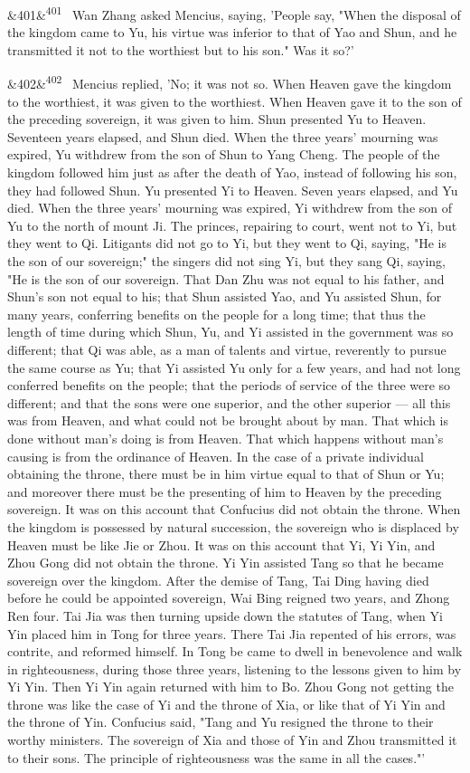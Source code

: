 \documentclass[12pt]{article}
\newcommand{\para}[1][]{\par\noindent\ifx&#1&\else\textsuperscript{\footnotesize #1}~\fi}
\begin{document}
\para[401] Wan Zhang asked Mencius, saying, 'People say, "When the disposal of the kingdom came to Yu, his virtue was inferior to that of Yao and Shun, and he transmitted it not to the worthiest but to his son." Was it so?'

\para[402] Mencius replied, 'No; it was not so. When Heaven gave the kingdom to the worthiest, it was given to the worthiest. When Heaven gave it to the son of the preceding sovereign, it was given to him. Shun presented Yu to Heaven. Seventeen years elapsed, and Shun died. When the three years' mourning was expired, Yu withdrew from the son of Shun to Yang Cheng. The people of the kingdom followed him just as after the death of Yao, instead of following his son, they had followed Shun. Yu presented Yi to Heaven. Seven years elapsed, and Yu died. When the three years' mourning was expired, Yi withdrew from the son of Yu to the north of mount Ji. The princes, repairing to court, went not to Yi, but they went to Qi. Litigants did not go to Yi, but they went to Qi, saying, "He is the son of our sovereign;" the singers did not sing Yi, but they sang Qi, saying, "He is the son of our sovereign. That Dan Zhu was not equal to his father, and Shun's son not equal to his; that Shun assisted Yao, and Yu assisted Shun, for many years, conferring benefits on the people for a long time; that thus the length of time during which Shun, Yu, and Yi assisted in the government was so different; that Qi was able, as a man of talents and virtue, reverently to pursue the same course as Yu; that Yi assisted Yu only for a few years, and had not long conferred benefits on the people; that the periods of service of the three were so different; and that the sons were one superior, and the other superior --- all this was from Heaven, and what could not be brought about by man. That which is done without man's doing is from Heaven. That which happens without man's causing is from the ordinance of Heaven. In the case of a private individual obtaining the throne, there must be in him virtue equal to that of Shun or Yu; and moreover there must be the presenting of him to Heaven by the preceding sovereign. It was on this account that Confucius did not obtain the throne. When the kingdom is possessed by natural succession, the sovereign who is displaced by Heaven must be like Jie or Zhou. It was on this account that Yi, Yi Yin, and Zhou Gong did not obtain the throne. Yi Yin assisted Tang so that he became sovereign over the kingdom. After the demise of Tang, Tai Ding having died before he could be appointed sovereign, Wai Bing reigned two years, and Zhong Ren four. Tai Jia was then turning upside down the statutes of Tang, when Yi Yin placed him in Tong for three years. There Tai Jia repented of his errors, was contrite, and reformed himself. In Tong be came to dwell in benevolence and walk in righteousness, during those three years, listening to the lessons given to him by Yi Yin. Then Yi Yin again returned with him to Bo. Zhou Gong not getting the throne was like the case of Yi and the throne of Xia, or like that of Yi Yin and the throne of Yin. Confucius said, "Tang and Yu resigned the throne to their worthy ministers. The sovereign of Xia and those of Yin and Zhou transmitted it to their sons. The principle of righteousness was the same in all the cases."'
\end{document}
